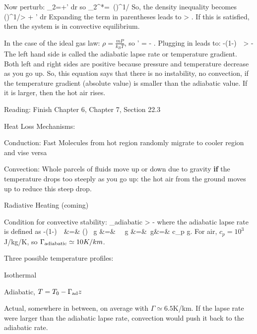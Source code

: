 \documentclass[11pt]{book}
\begin{document}
Now perturb:
\be\rho_2=\rho+\rho' dr
\ee
so
\be
\rho_2^*= \rho \,\left(\right)^{1/\gamma}\ee
So, the density inequality becomes
\be
\rho \,\left(\right)^{1/\gamma}> \rho + \rho' dr\ee
Expanding the term in parentheses leads to
\be
{} > .
\ee
If this is satisfied, then the system is in convective equilibrium.

In the case of the ideal gas law: $\rho= \frac{mP}{k_BT}$, so
\be
\rho' =  - 
.\ee
Plugging in leads to:
\be
-\left(1-\right)\, \,  > -
\ee
The left hand side is called the adiabatic lapse rate or temperature gradient. Both left and right sides are positive because pressure and temperature decrease as you go up.
So, this equation says that there is no instability, no convection, if the temperature gradient (absolute value) is smaller than the adiabatic value. If it is larger, then the hot air rises.


Reading: Finish Chapter 6, Chapter 7, Section 22.3

Heat Loss Mechanisms:
\bee
\item Conduction: Fast Molecules from hot region randomly migrate to cooler region and vise versa
\item Convection: Whole parcels of fluids move up or down due to gravity {\bf if} the temperature drops too steeply as you go up: the hot air from the ground moves up to reduce this steep drop.
\item Radiative Heating (coming)
\eee

Condition for convective stability:
\be
\Gamma_{\rm adiabatic} > -\ee
where the adiabatic lapse rate is defined as
\bea
-\left(1-\right)\, \,  &=& \left(\right) \, \rho g
\vs
&=&
 \, \, g
\vs
&=&
\,g\vs&=&
c_p g.\eea
For air, $c_p=10^3$J/kg/K, so
$\Gamma_{\rm adiabatic} \simeq 10K/km$. 

Three possible temperature profiles:
\bee
\item Isothermal
\item Adiabatic, $T=T_0-\Gamma_{\rm ad} z$
\item Actual, somewhere in between, on average with $\Gamma\simeq 6.5$K/km. If the lapse rate were larger than the adiabatic lapse rate, convection would push it back to the adiabatic rate.  %
\eee
\end{document}

